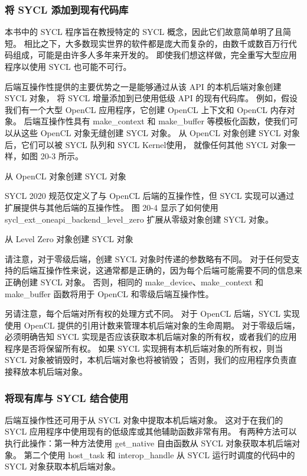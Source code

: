 \subsubsection{将 SYCL 添加到现有代码库}
本书中的 SYCL 程序旨在教授特定的 SYCL 概念，因此它们故意简单明了且简短。 
相比之下，大多数现实世界的软件都是庞大而复杂的，由数千或数百万行代码组成，可能是由许多人多年来开发的。 
即使我们想这样做，完全重写大型应用程序以使用 SYCL 也可能不可行。

后端互操作性提供的主要优势之一是能够通过从该 API 的本机后端对象创建 SYCL 对象，
将 SYCL 增量添加到已使用低级 API 的现有代码库。 
例如，假设我们有一个大型 OpenCL 应用程序，它创建 OpenCL 上下文和 OpenCL 内存对象。 
后端互操作性具有 make\_context 和 make\_buffer 等模板化函数，使我们可以从这些 OpenCL 对象无缝创建 SYCL 对象。 
从 OpenCL 对象创建 SYCL 对象后，它们可以被 SYCL 队列和 SYCL Kernel使用，
就像任何其他 SYCL 对象一样，如图 20-3 所示。

{\color{red} 从 OpenCL 对象创建 SYCL 对象}

SYCL 2020 规范仅定义了与 OpenCL 后端的互操作性，但 SYCL 实现可以通过扩展提供与其他后端的互操作性。 
图 20-4 显示了如何使用 sycl\_ext\_oneapi\_backend\_level\_zero 扩展从零级对象创建 SYCL 对象。

{\color{red} 从 Level Zero 对象创建 SYCL 对象}

请注意，对于零级后端，创建 SYCL 对象时传递的参数略有不同。 
对于任何受支持的后端互操作性来说，这通常都是正确的，因为每个后端可能需要不同的信息来正确创建 SYCL 对象。 
否则，相同的 make\_device、make\_context 和 make\_buffer 函数将用于 OpenCL 和零级后端互操作性。

另请注意，每个后端对所有权的处理方式不同。 
对于 OpenCL 后端，SYCL 实现使用 OpenCL 提供的引用计数来管理本机后端对象的生命周期。 
对于零级后端，必须明确告知 SYCL 实现是否应该获取本机后端对象的所有权，或者我们的应用程序是否将保留所有权。 
如果 SYCL 实现拥有本机后端对象的所有权，则当 SYCL 对象被销毁时，本机后端对象也将被销毁； 
否则，我们的应用程序负责直接释放本机后端对象。

\subsubsection{将现有库与 SYCL 结合使用}
后端互操作性还可用于从 SYCL 对象中提取本机后端对象。 
这对于在我们的 SYCL 应用程序中使用现有的低级库或其他辅助函数非常有用。 
有两种方法可以执行此操作：第一种方法使用 get\_native 自由函数从 SYCL 对象获取本机后端对象。 
第二个使用 host\_task 和 interop\_handle 从 SYCL 运行时调度的代码中的 SYCL 对象获取本机后端对象。


